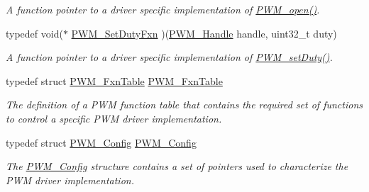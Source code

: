 \begin{DoxyCompactItemize}
\begin{DoxyCompactList}\small\item\em A function pointer to a driver specific implementation of \hyperlink{_p_w_m_8h_ac963beab0c5c6901bf852f175028aeaf}{P\-W\-M\-\_\-open()}. \end{DoxyCompactList}\item 
typedef void($\ast$ \hyperlink{_p_w_m_8h_ad6ff34d4a9e084d7c4edee8c7a1a29a1}{P\-W\-M\-\_\-\-Set\-Duty\-Fxn} )(\hyperlink{_p_w_m_8h_afdefc765f42bbad4dca246fda6e1354b}{P\-W\-M\-\_\-\-Handle} handle, uint32\-\_\-t duty)
\begin{DoxyCompactList}\small\item\em A function pointer to a driver specific implementation of \hyperlink{_p_w_m_8h_a9b4c4b744af933d4f2678dc18b49bfb4}{P\-W\-M\-\_\-set\-Duty()}. \end{DoxyCompactList}\item 
typedef struct \hyperlink{struct_p_w_m___fxn_table}{P\-W\-M\-\_\-\-Fxn\-Table} \hyperlink{_p_w_m_8h_a05890cc4f17c4343ff0ee612561fe267}{P\-W\-M\-\_\-\-Fxn\-Table}
\begin{DoxyCompactList}\small\item\em The definition of a P\-W\-M function table that contains the required set of functions to control a specific P\-W\-M driver implementation. \end{DoxyCompactList}\item 
typedef struct \hyperlink{struct_p_w_m___config}{P\-W\-M\-\_\-\-Config} \hyperlink{_p_w_m_8h_a007c9e36d0b1afcff70e1f2201845236}{P\-W\-M\-\_\-\-Config}
\begin{DoxyCompactList}\small\item\em The \hyperlink{struct_p_w_m___config}{P\-W\-M\-\_\-\-Config} structure contains a set of pointers used to characterize the P\-W\-M driver implementation. \end{DoxyCompactList}\end{DoxyCompactItemize}
